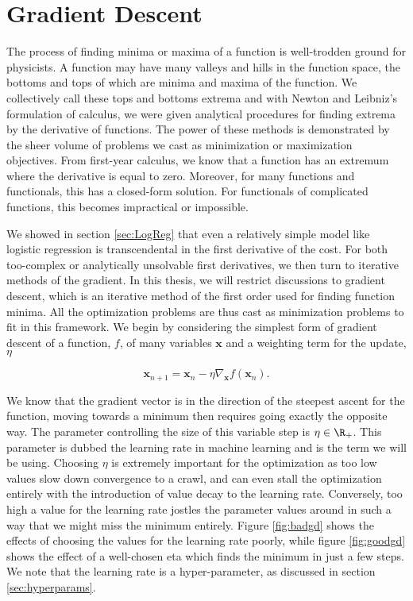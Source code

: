 \section{Gradient Descent}\label{sec:gd}

The process of finding minima or maxima of a function is well-trodden ground for physicists. A function may have many valleys and hills in the function space, the bottoms and tops of which are minima and maxima of the function. We collectively call these tops and bottoms extrema and with Newton and Leibniz's formulation of calculus, we were given analytical procedures for finding extrema by the derivative of functions. The power of these methods is demonstrated by the sheer volume of problems we cast as minimization or maximization objectives. From first-year calculus, we know that a function has an extremum where the derivative is equal to zero. Moreover, for many functions and functionals, this has a closed-form solution. For functionals of complicated functions, this becomes impractical or impossible. 

We showed in section \ref{sec:LogReg} that even a relatively simple model like logistic regression is transcendental in the first derivative of the cost. For both too-complex or analytically unsolvable first derivatives, we then turn to iterative methods of the gradient. In this thesis, we will restrict discussions to gradient descent, which is an iterative method of the first order used for finding function minima. All the optimization problems are thus cast as minimization problems to fit in this framework. We begin by considering the simplest form of gradient descent of a function, $f$, of many variables $\boldsymbol{x}$ and a weighting term for the update, $\eta$

\begin{equation}\label{eq:gd}
\boldsymbol{x}_{n+1} = \boldsymbol{x}_{n} - \eta \nabla_{\boldsymbol{x}} f(\boldsymbol{x}_{n}). 
\end{equation} 

\noindent We know that the gradient vector is in the direction of the steepest ascent for the function, moving towards a minimum then requires going exactly the opposite way. The parameter controlling the size of this variable step is  $\eta \in \R_+$. This parameter is dubbed the learning rate in machine learning and is the term we will be using. Choosing $\eta$ is extremely important for the optimization as too low values slow down convergence to a crawl, and can even stall the optimization entirely with the introduction of value decay to the learning rate. Conversely, too high a value for the learning rate jostles the parameter values around in such a way that we might miss the minimum entirely. Figure \ref{fig:badgd} shows the effects of choosing the values for the learning rate poorly, while figure \ref{fig:goodgd} shows the effect of a well-chosen eta which finds the minimum in just a few steps. We note that the learning rate is a hyper-parameter, as discussed in section \ref{sec:hyperparams}. 


